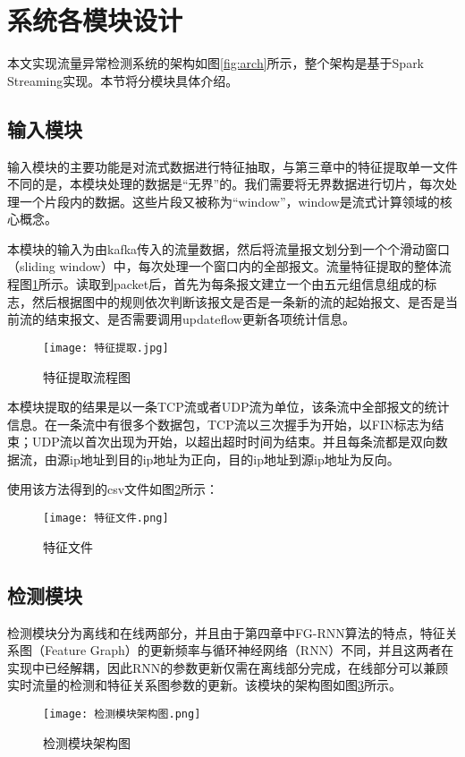 \section{系统各模块设计}
本文实现流量异常检测系统的架构如图\ref{fig:arch}所示，整个架构是基于Spark Streaming实现。本节将分模块具体介绍。
\subsection{输入模块}
输入模块的主要功能是对流式数据进行特征抽取，与第三章中的特征提取单一文件不同的是，本模块处理的数据是“无界”的。我们需要将无界数据进行切片，每次处理一个片段内的数据。这些片段又被称为“window”，window是流式计算领域的核心概念。

本模块的输入为由kafka传入的流量数据，然后将流量报文划分到一个个滑动窗口（sliding window）中，每次处理一个窗口内的全部报文。流量特征提取的整体流程图\ref{fig:特征提取}所示。读取到packet后，首先为每条报文建立一个由五元组信息组成的标志，然后根据图中的规则依次判断该报文是否是一条新的流的起始报文、是否是当前流的结束报文、是否需要调用updateflow更新各项统计信息。

\begin{figure}
  \centering
  \texttt{[image: 特征提取.jpg]}
  \caption{特征提取流程图}
  \label{fig:特征提取}
\end{figure}

本模块提取的结果是以一条TCP流或者UDP流为单位，该条流中全部报文的统计信息。在一条流中有很多个数据包，TCP流以三次握手为开始，以FIN标志为结束；UDP流以首次出现为开始，以超出超时时间为结束。并且每条流都是双向数据流，由源ip地址到目的ip地址为正向，目的ip地址到源ip地址为反向。

使用该方法得到的csv文件如图\ref{fig:特征文件}所示：
\begin{figure}
    \centering
    \texttt{[image: 特征文件.png]}
    \caption{特征文件}
    \label{fig:特征文件}
  \end{figure}


\subsection{检测模块}
检测模块分为离线和在线两部分，并且由于第四章中FG-RNN算法的特点，特征关系图（Feature Graph）的更新频率与循环神经网络（RNN）不同，并且这两者在实现中已经解耦，因此RNN的参数更新仅需在离线部分完成，在线部分可以兼顾实时流量的检测和特征关系图参数的更新。该模块的架构图如图\ref{fig:检测模块架构图}所示。
\begin{figure}
  \centering
  \texttt{[image: 检测模块架构图.png]}
  \caption{检测模块架构图}
  \label{fig:检测模块架构图}
\end{figure}


